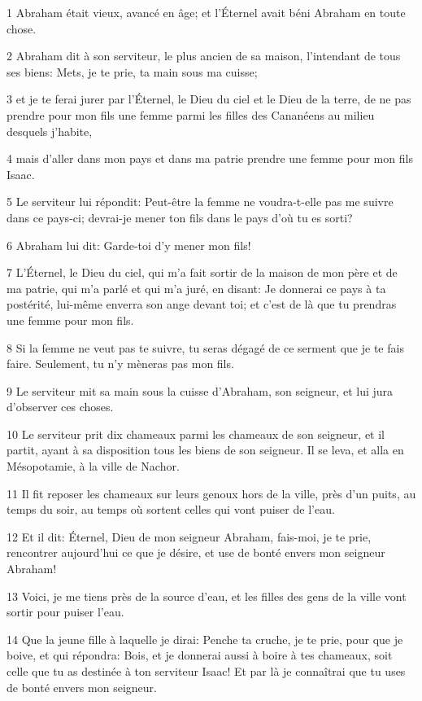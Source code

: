 \par 1 Abraham était vieux, avancé en âge; et l'Éternel avait béni Abraham en toute chose.
\par 2 Abraham dit à son serviteur, le plus ancien de sa maison, l'intendant de tous ses biens: Mets, je te prie, ta main sous ma cuisse;
\par 3 et je te ferai jurer par l'Éternel, le Dieu du ciel et le Dieu de la terre, de ne pas prendre pour mon fils une femme parmi les filles des Cananéens au milieu desquels j'habite,
\par 4 mais d'aller dans mon pays et dans ma patrie prendre une femme pour mon fils Isaac.
\par 5 Le serviteur lui répondit: Peut-être la femme ne voudra-t-elle pas me suivre dans ce pays-ci; devrai-je mener ton fils dans le pays d'où tu es sorti?
\par 6 Abraham lui dit: Garde-toi d'y mener mon fils!
\par 7 L'Éternel, le Dieu du ciel, qui m'a fait sortir de la maison de mon père et de ma patrie, qui m'a parlé et qui m'a juré, en disant: Je donnerai ce pays à ta postérité, lui-même enverra son ange devant toi; et c'est de là que tu prendras une femme pour mon fils.
\par 8 Si la femme ne veut pas te suivre, tu seras dégagé de ce serment que je te fais faire. Seulement, tu n'y mèneras pas mon fils.
\par 9 Le serviteur mit sa main sous la cuisse d'Abraham, son seigneur, et lui jura d'observer ces choses.
\par 10 Le serviteur prit dix chameaux parmi les chameaux de son seigneur, et il partit, ayant à sa disposition tous les biens de son seigneur. Il se leva, et alla en Mésopotamie, à la ville de Nachor.
\par 11 Il fit reposer les chameaux sur leurs genoux hors de la ville, près d'un puits, au temps du soir, au temps où sortent celles qui vont puiser de l'eau.
\par 12 Et il dit: Éternel, Dieu de mon seigneur Abraham, fais-moi, je te prie, rencontrer aujourd'hui ce que je désire, et use de bonté envers mon seigneur Abraham!
\par 13 Voici, je me tiens près de la source d'eau, et les filles des gens de la ville vont sortir pour puiser l'eau.
\par 14 Que la jeune fille à laquelle je dirai: Penche ta cruche, je te prie, pour que je boive, et qui répondra: Bois, et je donnerai aussi à boire à tes chameaux, soit celle que tu as destinée à ton serviteur Isaac! Et par là je connaîtrai que tu uses de bonté envers mon seigneur.
